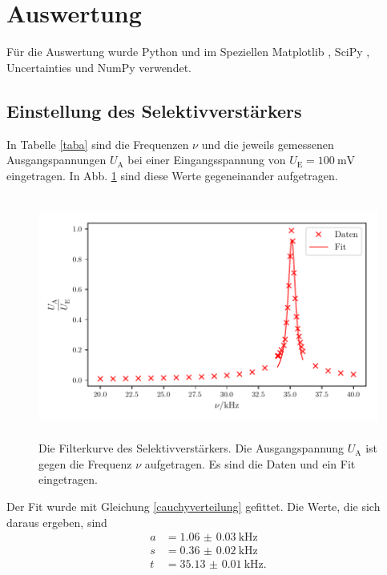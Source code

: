 \section{Auswertung}
\label{sec:Auswertung}

Für die Auswertung wurde Python und im Speziellen Matplotlib \cite{matplotlib}, SciPy \cite{scipy},
Uncertainties \cite{uncertainties} und NumPy \cite{numpy} verwendet.

\subsection{Einstellung des Selektivverstärkers}
In Tabelle \ref{taba} sind die Frequenzen $\nu$ und die jeweils gemessenen Ausgangspannungen $U_\text{A}$ 
bei einer Eingangsspannung von $U_\text{E} = \SI{100}{\milli\volt}$ eingetragen. 
In Abb. \ref{plota} sind diese Werte gegeneinander aufgetragen.



\begin{figure}
    \centering
    \includegraphics[width=15cm, height=8cm]{build/plota2.pdf} %
    \caption{Die Filterkurve des Selektivverstärkers. Die Ausgangspannung $U_\text{A}$
    ist gegen die Frequenz $\nu$ aufgetragen. Es sind die Daten und ein Fit eingetragen.}
    \label{plota}
\end{figure}

\noindent Der Fit wurde mit Gleichung \eqref{cauchyverteilung} gefittet. Die Werte, die sich daraus ergeben, sind
\begin{align*} 
  a &= \SI{1.06(3)}{\kilo\hertz} \\
  s &= \SI{0.36(2)}{\kilo\hertz} \\
  t &= \SI{35.13(1)}{\kilo\hertz}. 
\end{align*}


